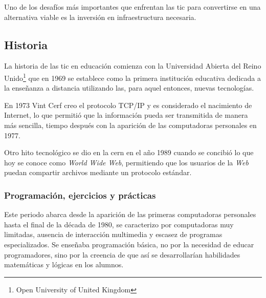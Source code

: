 Uno de los desafíos más importantes que enfrentan las \Gls{tic} para convertirse
en una alternativa viable es la inversión en infraestructura
necesaria\cite{unesco:ict}. 

\subsection{Historia}


La historia de las \Gls{tic} en educación comienza con la Universidad Abierta
del Reino Unido\footnote{Open University of United Kingdom} que en 1969 se
establece como la primera institución educativa dedicada a la enseñanza a
distancia utilizando las, para aquel entonces, nuevas
tecnologías\cite{tinio:ict}.

En 1973 Vint Cerf creo el protocolo TCP/IP y es considerado el nacimiento de
Internet\cite{white:ict}, lo que permitió que la información pueda ser
transmitida de manera más sencilla, tiempo después con la aparición de las
computadoras personales en 1977\cite{white:ict}. 
   


Otro hito tecnológico se dio en la \Gls{cern} en el año 1989 cuando se concibió
lo que hoy se conoce como \emph{World Wide Web}, permitiendo que los usuarios de
la \emph{Web} puedan compartir archivos mediante un protocolo
estándar\cite{white:ict}. 


\subsubsection{Programación, ejercicios y prácticas}


Este periodo abarca desde la aparición de las primeras computadoras
personales hasta el final de la década de 1980, se caracterizo por
computadoras muy limitadas, ausencia de interacción multimedia y escasez de
programas especializados. Se enseñaba programación básica\cite{leinonen:ict}, no
por la necesidad de educar programadores, sino por la creencia de que así se
desarrollarían habilidades matemáticas y lógicas en los alumnos. 


